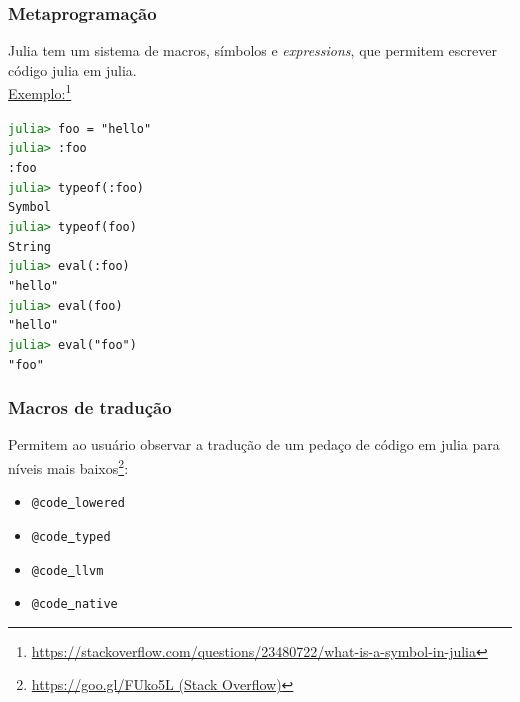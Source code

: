 \documentclass{beamer}
\begin{document}
\begin{frame}
	\frametitle{Metaprogramação}
    Julia tem um sistema de macros, símbolos e \emph{expressions}, que permitem escrever código julia em julia. \\
    \underline{Exemplo:}\footnote{\url{https://stackoverflow.com/questions/23480722/what-is-a-symbol-in-julia}}
    \begin{center}
    \begin{minipage}{8cm}
    	\small{%
	    \texttt{\textcolor{green}{julia>} foo = "hello"}\\
		\texttt{\textcolor{green}{julia>} :foo}\\
		\texttt{:foo}\\
		\texttt{\textcolor{green}{julia>} typeof(:foo)}\\
		\texttt{Symbol}\\
		\texttt{\textcolor{green}{julia>} typeof(foo)}\\
		\texttt{String}\\
		\texttt{\textcolor{green}{julia>} eval(:foo)}\\
		\texttt{"hello"}\\
		\texttt{\textcolor{green}{julia>} eval(foo)}\\
        \texttt{"hello"}\\
        \texttt{\textcolor{green}{julia>} eval("foo")}\\
        \texttt{"foo"}
        }
    \end{minipage}
    \end{center}

\end{frame}

\begin{frame}
	\frametitle{Macros de tradução}
    Permitem ao usuário observar a tradução de um pedaço de código em julia para níveis mais baixos\footnote{\url{https://goo.gl/FUko5L (Stack Overflow)}}:
    \vfill
    \begin{itemize}
		\item \texttt{@code\underline{\ }lowered}
        \item \texttt{@code\underline{\ }typed}
        \item \texttt{@code\underline{\ }llvm}
        \item \texttt{@code\underline{\ }native}
    \end{itemize}
\end{frame}
\end{document}

